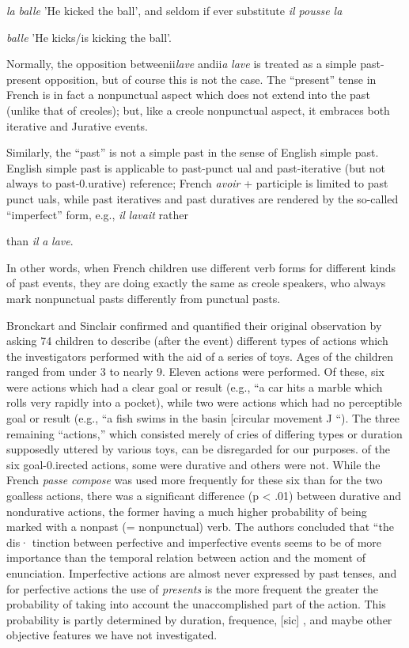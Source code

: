 \textit{la} \textit{balle }'He kicked the ball', and seldom if ever substitute \textit{il pousse la}

\textit{balle} 'He kicks/is kicking the ball'.

Normally, the opposition betweenii\textit{lave} andii\textit{a} \textit{lave }is treated as a simple past-present opposition, but of course this is not the case. The ``present'' tense in French is in fact a nonpunctual aspect which does not extend into the past (unlike that of creoles); but, like a creole nonpunctual aspect, it embraces both iterative and Jurative events.


Similarly, the ``past'' is not a simple past in the sense of English simple past. English simple past is applicable to past-punct ual and past-iterative (but not always to past-0.urative) reference; French \textit{avoir} + participle is limited to past punct uals, while past iteratives and past duratives are rendered by the so-called ``imperfect'' form, e.g., \textit{il} \textit{lavait} rather

than \textit{il} \textit{a} \textit{lave}.

In other words, when French children use different verb forms for different kinds of past events, they are doing exactly the same as creole speakers, who always mark nonpunctual pasts differently from
punctual pasts.

Bronckart and Sinclair confirmed and quantified their original observation by asking 74 children to describe (after the event) different types of actions which the investigators performed with the aid of a series of toys. Ages of the children ranged from under 3 to nearly 9. Eleven actions were performed. Of these, six were actions which had a clear goal or result (e.g., ``a car hits a marble which rolls very rapidly into a pocket{\textquotedbl}), while two were actions which had no perceptible goal
or result (e.g., ``a fish swims in the basin [circular movement J ``). The
three remaining ``actions,'' which consisted merely of cries of differing types or duration supposedly uttered by various toys, can be disre\-garded for our purposes.
of the six goal-0.irected actions, some were durative and others
were not. While the French \textit{passe} \textit{compose} was used more frequently for these six than for the two goalless actions, there was a significant
difference (p {\textless} .01) between durative and nondurative actions, the
former having a much higher probability of being marked with a nonpast (= nonpunctual) verb. The authors concluded that ``the dis· tinction between perfective and imperfective events seems to be of more importance than the temporal relation between action and the moment of enunciation. Imperfective actions are almost never ex\-pressed by past tenses, and for perfective actions the use of \textit{presents}
is the more frequent the greater the probability of taking into account the unaccomplished part of the action. This probability is partly determined by duration, frequence, [sic] , and maybe other objective features we have not investigated.{\textquotedbl}

